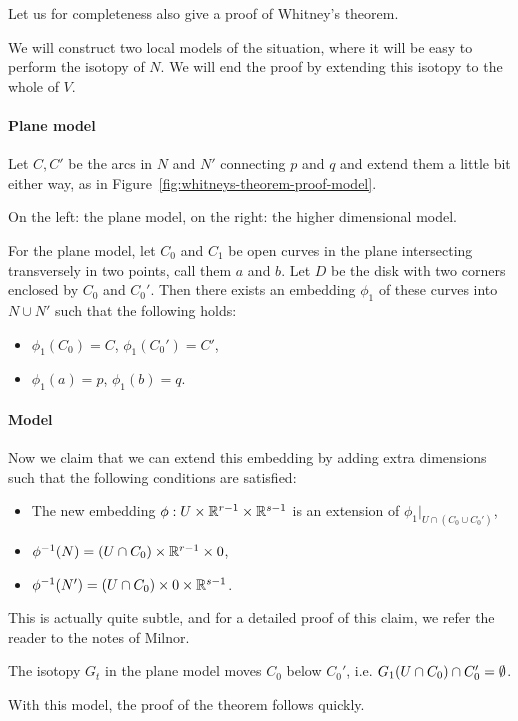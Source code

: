 Let us for completeness also give a proof of Whitney's theorem.
\begin{myproof}
    We will construct two local models of the situation, where it will be easy to perform the isotopy of $N$. We will end the proof by extending this isotopy to the whole of $V$.

    \paragraph{Plane model}
    Let $C, C'$ be the arcs in  $N$ and $N'$ connecting $p$ and  $q$ and extend them a little bit either way, as in Figure~\ref{fig:whitneys-theorem-proof-model}.
    \begin{marginfigure}
        \center
        \caption{On the left: the plane model, on the right: the higher dimensional model.}
        \label{fig:whitneys-theorem-proof-model}
    \end{marginfigure}
    For the plane model, let $C_0$ and $ C_1$ be open curves in the plane intersecting transversely in two points, call them $a$ and $b$.
    Let $D$ be the disk with two corners enclosed by $C_0$ and $C_0'$.
    Then there exists an embedding $\phi_1$ of these curves into $N \cup N'$ such that the following holds:
     \begin{itemize}
         \item $\phi_1(C_0) = C$, $\phi_1(C_0') = C'$,
         \item $\phi_1(a) = p$, $\phi_1(b) = q$.
    \end{itemize}
    \paragraph{Model}
    Now we claim that we can extend this embedding by adding extra dimensions such that the following conditions are satisfied:
    \begin{itemize}
        \item The new embedding $\phi: U \times \mathbb{R}^{r-1} \times \mathbb{R}^{s-1}$ is an extension of $\phi_1|_{U \cap (C_0 \cup C_0')}$,
        \item $\phi^{-1}(N) = (U \cap C_0) \times \mathbb{R}^{r-1} \times 0$,
            \item $\phi^{-1}(N') = (U \cap C_0) \times 0\times \mathbb{R}^{s-1}$.
    \end{itemize}
    This is actually quite subtle, and for a detailed proof of this claim, we refer the reader to the notes of Milnor.
    \begin{marginfigure}
        \centering
        \caption{The isotopy $G_t$ in the plane model moves $C_0$ below $ C_0'$, i.e. $ G_1(U \cap C_0) \cap C_0' = \emptyset$.}
        \label{fig:whitneys-theorem-model-isotopy}
    \end{marginfigure}
    With this model, the proof of the theorem follows quickly.

\end{myproof}
